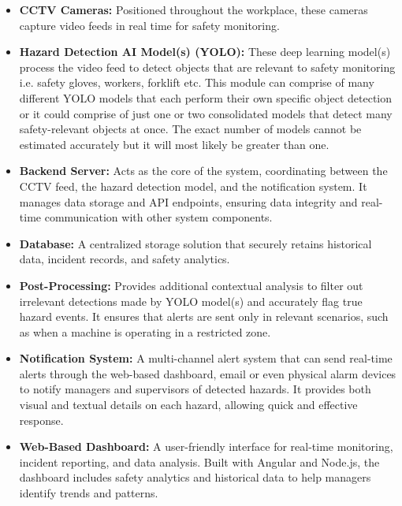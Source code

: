 \documentclass[12pt]{article}
\begin{document}
\begin{itemize}
    \item \textbf{CCTV Cameras:} Positioned throughout the workplace, these cameras capture video feeds in real time for safety monitoring.

    \item \textbf{Hazard Detection AI Model(s) (YOLO):} These deep learning model(s) process the video feed to detect objects that are relevant to safety monitoring i.e. safety gloves, workers, forklift etc. This module can comprise of many different YOLO models that each perform their own specific object detection or it could comprise of just one or two consolidated models that detect many safety-relevant objects at once. The exact number of models cannot be estimated accurately but it will most likely be greater than one.

    \item \textbf{Backend Server:} Acts as the core of the system, coordinating between the CCTV feed, the hazard detection model, and the notification system. It manages data storage and API endpoints, ensuring data integrity and real-time communication with other system components.

    \item \textbf{Database:} A centralized storage solution that securely retains historical data, incident records, and safety analytics.

    \item \textbf{Post-Processing:} Provides additional contextual analysis to filter out irrelevant detections made by YOLO model(s) and accurately flag true hazard events. It ensures that alerts are sent only in relevant scenarios, such as when a machine is operating in a restricted zone.

    \item \textbf{Notification System:} A multi-channel alert system that can send real-time alerts through the web-based dashboard, email or even physical alarm devices to notify managers and supervisors of detected hazards. It provides both visual and textual details on each hazard, allowing quick and effective response.

    \item \textbf{Web-Based Dashboard:} A user-friendly interface for real-time monitoring, incident reporting, and data analysis. Built with Angular and Node.js, the dashboard includes safety analytics and historical data to help managers identify trends and patterns.
\end{itemize}
\end{document}
